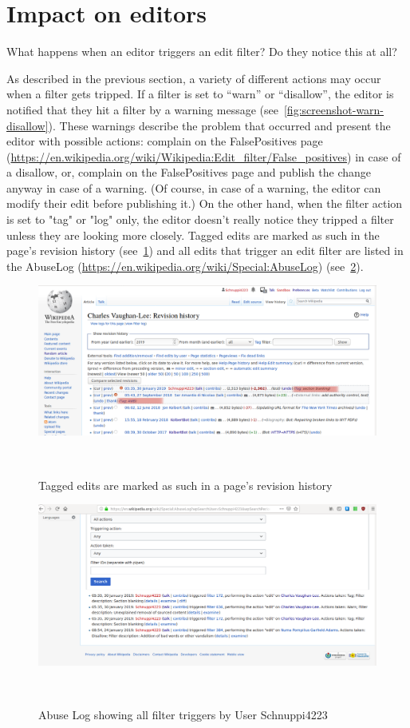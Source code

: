 \documentclass{sigchi}
\begin{document}
\section{Impact on editors}

What happens when an editor triggers an edit filter? Do they notice this at all?

As described in the previous section, a variety of different actions may occur when a filter gets tripped.
If a filter is set to ``warn'' or ``disallow'', the editor is notified that they hit a filter by a warning message (see~\ref{fig:screenshot-warn-disallow}).
These warnings describe the problem that occurred and present the editor with possible actions:
complain on the FalsePositives page (\url{https://en.wikipedia.org/wiki/Wikipedia:Edit_filter/False_positives}) in case of a disallow,
or, complain on the FalsePositives page and publish the change anyway in case of a warning.
(Of course, in case of a warning, the editor can modify their edit before publishing it.)
On the other hand, when the filter action is set to "tag" or "log" only, the editor doesn't really notice they tripped a filter unless they are looking more closely.
Tagged edits are marked as such in the page's revision history (see~\ref{fig:tags-in-history})
and all edits that trigger an edit filter are listed in the AbuseLog (\url{https://en.wikipedia.org/wiki/Special:AbuseLog}) (see~\ref{fig:screenshot-abuse-log}).

\begin{figure}
\centering
  \includegraphics[width=0.9\columnwidth]{figures/screenshots-filter-trigger/Screenshot-tags-in-revision-history.png}
  \caption{Tagged edits are marked as such in a page's revision history}~\label{fig:tags-in-history}
\end{figure}

\begin{figure}
\centering
  \includegraphics[width=0.9\columnwidth]{figures/screenshots-filter-trigger/Screenshot-abuse-log.png}
  \caption{Abuse Log showing all filter triggers by User Schnuppi4223}~\label{fig:screenshot-abuse-log}
\end{figure}
\end{document}
